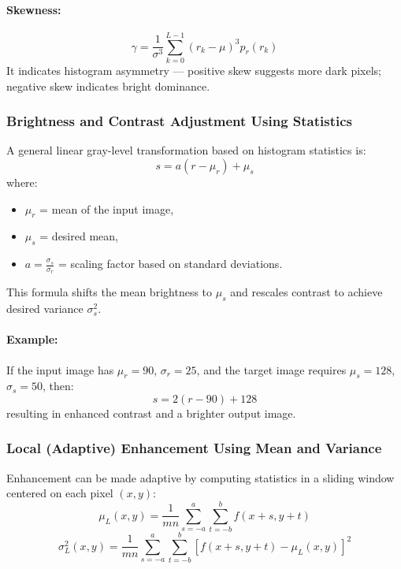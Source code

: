 \documentclass[12pt,a4paper]{AnantDocumentation}
\begin{document}
\paragraph{Skewness:}
\begin{equation}
\gamma = \frac{1}{\sigma^3} \sum_{k=0}^{L-1} (r_k - \mu)^3 p_r(r_k)
\end{equation}
It indicates histogram asymmetry — positive skew suggests more dark pixels; negative skew indicates bright dominance.

\subsubsection{Brightness and Contrast Adjustment Using Statistics}

A general linear gray-level transformation based on histogram statistics is:
\begin{equation}
s = a (r - \mu_r) + \mu_s
\end{equation}
where:
\begin{itemize}
\item $\mu_r$ = mean of the input image,
\item $\mu_s$ = desired mean,
\item $a = \frac{\sigma_s}{\sigma_r}$ = scaling factor based on standard deviations.
\end{itemize}

This formula shifts the mean brightness to $\mu_s$ and rescales contrast to achieve desired variance $\sigma_s^2$.

\paragraph{Example:}  
If the input image has $\mu_r = 90$, $\sigma_r = 25$, and the target image requires $\mu_s = 128$, $\sigma_s = 50$, then:
\[
s = 2(r - 90) + 128
\]
resulting in enhanced contrast and a brighter output image.

\subsubsection{Local (Adaptive) Enhancement Using Mean and Variance}

Enhancement can be made adaptive by computing statistics in a sliding window centered on each pixel $(x, y)$:
\begin{equation}
\mu_L(x, y) = \frac{1}{mn} \sum_{s=-a}^{a}\sum_{t=-b}^{b} f(x+s, y+t)
\end{equation}
\begin{equation}
\sigma_L^2(x, y) = \frac{1}{mn} \sum_{s=-a}^{a}\sum_{t=-b}^{b} [f(x+s, y+t) - \mu_L(x, y)]^2
\end{equation}
\end{document}
